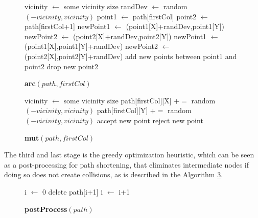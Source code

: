\documentclass[10pt, conference, compsoc]{IEEEtran}
\begin{document}
\setcounter{temp}{\value{figure}}
\setcounter{figure}{\value{algo}}
\renewcommand{\figurename}{Algorithm}
\begin{figure}[ht]
    \caption{\bf arc$(path, firstCol)$}
    \label{alg:arc}
    \begin{algorithmic}[1]
        \REQUIRE vicinity $\leftarrow$ some vicinity size
        \STATE randDev $\leftarrow$ random$(-vicinity, vicinity)$
        \STATE point1 $\leftarrow$ path[firstCol]
        \STATE point2 $\leftarrow$ path[firstCol+1]
            \STATE newPoint1 $\leftarrow$ (point1[X]+randDev,point1[Y]) 
            \STATE newPoint2 $\leftarrow$ (point2[X]+randDev,point2[Y]) 
        \ELSE
            \STATE newPoint1 $\leftarrow$ (point1[X],point1[Y]+randDev) 
            \STATE newPoint2 $\leftarrow$ (point2[X],point2[Y]+randDev) 
        \ENDIF
            \STATE add new points between point1 and point2
        \ELSE
            \STATE drop new point2
        \ENDIF
    \end{algorithmic}
\end{figure}
\addtocounter{algo}{1}
\renewcommand{\figurename}{Figure}
\setcounter{figure}{\value{temp}}

\setcounter{temp}{\value{figure}}
\setcounter{figure}{\value{algo}}
\renewcommand{\figurename}{Algorithm}
\begin{figure}[ht]
    \caption{\bf mut$(path, firstCol)$}
    \label{alg:mut}
    \begin{algorithmic}[1]
        \REQUIRE vicinity $\leftarrow$ some vicinity size
        \STATE path[firstCol][X] $+=$ random$(-vicinity, vicinity)$
        \STATE path[firstCol][Y] $+=$ random$(-vicinity, vicinity)$
            \STATE accept new point
        \ELSE
            \STATE reject new point
        \ENDIF
    \end{algorithmic}
\end{figure}
\renewcommand{\figurename}{Figure}
\addtocounter{algo}{1}
\setcounter{figure}{\value{temp}}

The third and last stage is the greedy optimization heuristic,
which can be seen as a post-processing for path shortening, that
eliminates intermediate nodes if doing so does not create collisions,
as is described in the Algorithm \ref{alg:postProcess}.

\setcounter{temp}{\value{figure}}
\setcounter{figure}{\value{algo}}
\renewcommand{\figurename}{Algorithm}
\begin{figure}[ht]
    \caption{\bf postProcess$(path)$}
    \label{alg:postProcess}
    \begin{algorithmic}[1]
        \STATE i $\leftarrow$ 0
                \STATE delete path[i+1]
            \ELSE
                \STATE i $\leftarrow$ i+1
            \ENDIF
        \ENDWHILE
    \end{algorithmic}
\end{figure}
\renewcommand{\figurename}{Figure}
\addtocounter{algo}{1}
\setcounter{figure}{\value{temp}}
\end{document}
